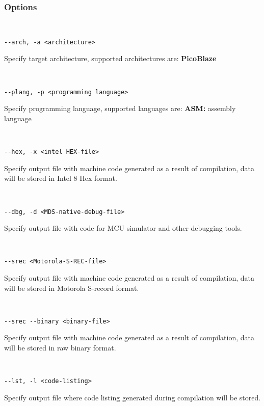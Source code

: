         \subsubsection{Options}
            {
            ~\\
            \usecodefont

            \verb'--arch, -a <architecture>'\\
            }
            Specify target architecture, supported architectures are: \textbf{PicoBlaze}
            {
            ~\\
            \usecodefont

            \verb'--plang, -p <programming language>'\\
            }
            Specify programming language, supported languages are: \textbf{ASM:} assembly language
            {
            ~\\
            \usecodefont

            \verb'--hex, -x <intel HEX-file>'\\
            }
            Specify output file with machine code generated as a result of compilation, data will be stored in Intel 8 Hex format.
            {
            ~\\
            \usecodefont

            \verb'--dbg, -d <MDS-native-debug-file>'\\
            }
            Specify output file with code for MCU simulator and other debugging tools.
            {
            ~\\
            \usecodefont

            \verb'--srec <Motorola-S-REC-file>'\\
            }
            Specify output file with machine code generated as a result of compilation, data will be stored in Motorola S-record format.
            {
            ~\\
            \usecodefont

            \verb'--srec --binary <binary-file>'\\
            }
            Specify output file with machine code generated as a result of compilation, data will be stored in raw binary format.
            {
            ~\\
            \usecodefont

            \verb'--lst, -l <code-listing>'\\
            }
            Specify output file where code listing generated during compilation will be stored.
